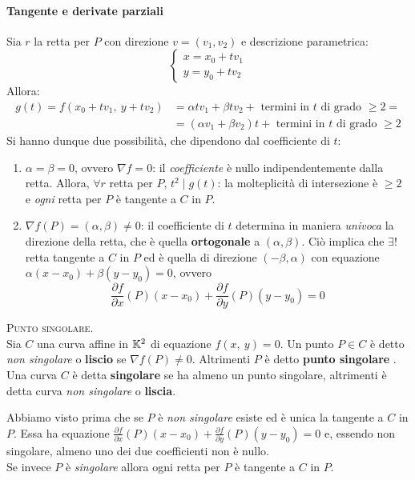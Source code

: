 \paragraph{Tangente e derivate parziali}
Sia $r$ la retta per $P$ con direzione $v=(v_1,v_2)$ e descrizione parametrica:
\begin{equation*}
	\begin{cases}
		x=x_0+tv_1\\
		y=y_0+tv_2
	\end{cases}
\end{equation*}
Allora:
	\begin{equation*}
		\begin{array}{ll}
			g(t)=f(x_0+tv_1,\ y+tv_2)&=\alpha tv_1+\beta tv_2 + \text{ termini in }t\text{ di grado }\geq 2 =\\
			&= (\alpha v_1+\beta v_2)t + \text{ termini in }t \text{ di grado }\geq 2
		\end{array}	
	\end{equation*}
Si hanno dunque due possibilità, che dipendono dal coefficiente di $t$:
	\begin{enumerate}
		\item	$\alpha=\beta=0$, ovvero $\nabla f =0$: il \textit{coefficiente} è nullo indipendentemente dalla retta. Allora, $\forall r$ retta per $P$,  $t^2 \mid g(t)$: la molteplicità di intersezione è $\geq 2$ e \textit{ogni} retta per $P$ è tangente a $C$ in $P$.
		\item	$\nabla f\left(P\right)=(\alpha,\beta)\neq 0$:	il coefficiente di $t$ determina in maniera \textit{univoca} la direzione della retta, che è quella \textbf{ortogonale} a $(\alpha,\beta)$. Ciò implica che $\exists !$ retta tangente a $C$ in $P$ ed è quella di direzione $(-\beta,\alpha)$ con equazione	$\alpha(x-x_0)+\beta(y-y_0)=0$, ovvero 
			\begin{equation}
				\frac{\partial{f}}{\partial{x}}\left(P\right)(x-x_0) + \frac{\partial{f}}{\partial{y}} \left(P\right)(y-y_0)=0
			\end{equation}
	\end{enumerate}
\begin{define}\textsc{Punto singolare}.\\
	Sia $C$ una curva affine in $\mathbb{K}^2$ di equazione $f\left(x,\ y\right)=0$. Un punto $P\in C$ è detto \textit{non singolare} o \textbf{liscio} se $\nabla f\left(P\right)\neq 0$. Altrimenti $P$ è detto \textbf{punto singolare} .\\
	Una curva $C$ è detta \textbf{singolare} se ha almeno un punto singolare, altrimenti è detta curva \textit{non singolare} o \textbf{liscia}.
\end{define}
Abbiamo visto prima che se $P$ è \textit{non singolare} esiste ed è unica la tangente a $C$ in $P$. Essa ha equazione	$\frac{\partial{f}}{\partial{x}}\left(P\right)(x-x_0) + \frac{\partial{f}}{\partial{y}} \left(P\right)(y-y_0)=0$ e, essendo non singolare, almeno uno dei due coefficienti non è nullo.\\
Se invece $P$ è \textit{singolare} allora ogni retta per $P$ è tangente a $C$ in $P$.
